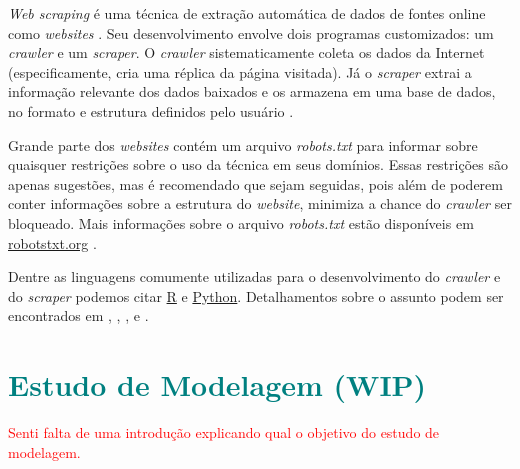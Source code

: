 \documentclass{automatextcc}
\newcommand{\nico}[1]{\textcolor{teal}{#1}}
\newcommand{\pumi}[1]{\textcolor{red}{#1}}
\begin{document}

\textit{Web scraping} é uma técnica de extração automática de dados de fontes online como \textit{websites} \citep{farley2017,khder2021}. Seu desenvolvimento envolve dois programas customizados: um \textit{crawler} e um \textit{scraper}. O \textit{crawler} sistematicamente coleta os dados da Internet (especificamente, cria uma réplica da página visitada). Já o \textit{scraper} extrai a informação relevante dos dados baixados e os armazena em uma base de dados, no formato e estrutura definidos pelo usuário \citep{lawson2015,patil2016}.

Grande parte dos \textit{websites} contém um arquivo \textit{robots.txt} para informar sobre quaisquer restrições sobre o uso da técnica em seus domínios. Essas restrições são apenas sugestões, mas é recomendado que sejam seguidas, pois além de poderem conter informações sobre a estrutura do \textit{website}, minimiza a chance do \textit{crawler} ser bloqueado. Mais informações sobre o arquivo \textit{robots.txt} estão disponíveis em \url{robotstxt.org} \citep{lawson2015}.

Dentre as linguagens comumente utilizadas para o desenvolvimento do \textit{crawler} e do \textit{scraper} podemos citar \href{https://cran.r-project.org}{R} e \href{https://python.org/}{Python}. Detalhamentos sobre o assunto podem ser encontrados em \citet{lawson2015}, \citet{sirisuriya2015}, \citet{patil2016}, \citet{farley2017} e \citet{khder2021}.



\chapter{\nico{Estudo de Modelagem (WIP)}}
\pumi{Senti falta de uma introdução explicando qual o objetivo do estudo de modelagem.}
\end{document}
